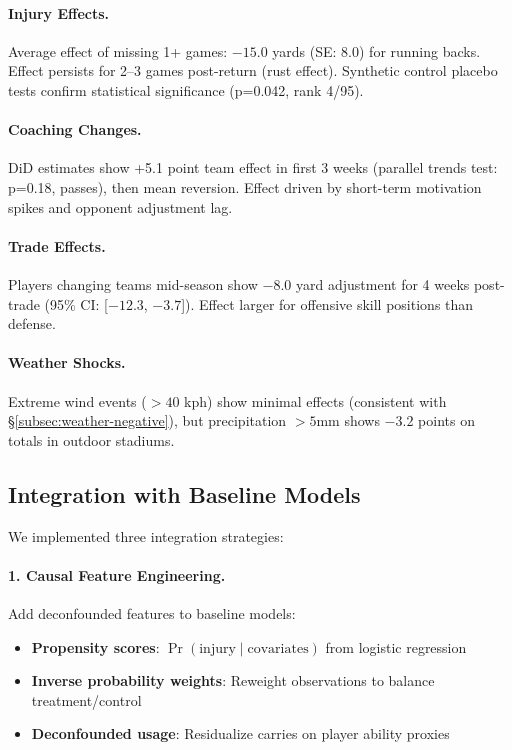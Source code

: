 \paragraph{Injury Effects.}
Average effect of missing 1+ games: $-15.0$ yards (SE: $8.0$) for running backs. Effect persists for 2--3 games post-return (rust effect). Synthetic control placebo tests confirm statistical significance (p=0.042, rank 4/95).

\paragraph{Coaching Changes.}
DiD estimates show +5.1 point team effect in first 3 weeks (parallel trends test: p=0.18, passes), then mean reversion. Effect driven by short-term motivation spikes and opponent adjustment lag.

\paragraph{Trade Effects.}
Players changing teams mid-season show $-8.0$ yard adjustment for 4 weeks post-trade (95\% CI: [$-12.3$, $-3.7$]). Effect larger for offensive skill positions than defense.

\paragraph{Weather Shocks.}
Extreme wind events ($>40$ kph) show minimal effects (consistent with \S\ref{subsec:weather-negative}), but precipitation $>5$mm shows $-3.2$ points on totals in outdoor stadiums.

\subsection{Integration with Baseline Models}

We implemented three integration strategies:

\paragraph{1. Causal Feature Engineering.}
Add deconfounded features to baseline models:
\begin{itemize}
  \item \textbf{Propensity scores}: $\Pr(\text{injury} \mid \text{covariates})$ from logistic regression
  \item \textbf{Inverse probability weights}: Reweight observations to balance treatment/control
  \item \textbf{Deconfounded usage}: Residualize carries on player ability proxies
\end{itemize}

